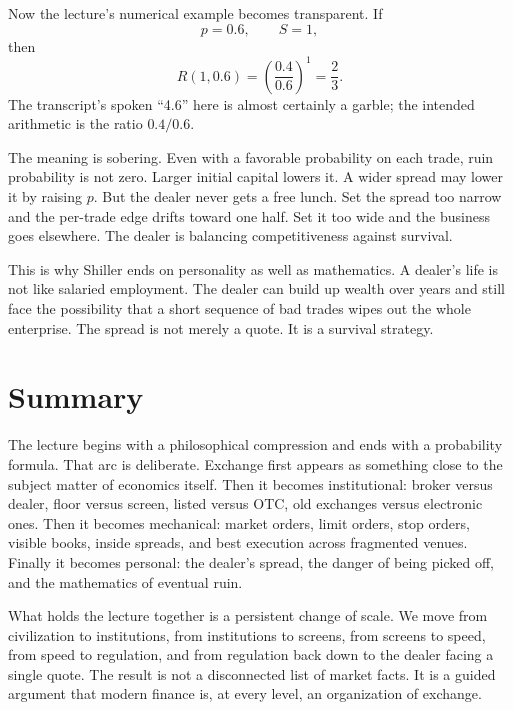 Now the lecture's numerical example becomes transparent. If
\begin{equation}
p=0.6,
\qquad
S=1,
\end{equation}
then
\begin{equation}
R(1,0.6)=\left(\frac{0.4}{0.6}\right)^1=\frac23.
\end{equation}
The transcript's spoken ``4.6'' here is almost certainly a garble; the intended arithmetic is the ratio \(0.4/0.6\).

The meaning is sobering. Even with a favorable probability on each trade, ruin probability is not zero. Larger initial capital lowers it. A wider spread may lower it by raising \(p\). But the dealer never gets a free lunch. Set the spread too narrow and the per-trade edge drifts toward one half. Set it too wide and the business goes elsewhere. The dealer is balancing competitiveness against survival.

This is why Shiller ends on personality as well as mathematics. A dealer's life is not like salaried employment. The dealer can build up wealth over years and still face the possibility that a short sequence of bad trades wipes out the whole enterprise. The spread is not merely a quote. It is a survival strategy.

\section{Summary}

The lecture begins with a philosophical compression and ends with a probability formula. That arc is deliberate. Exchange first appears as something close to the subject matter of economics itself. Then it becomes institutional: broker versus dealer, floor versus screen, listed versus OTC, old exchanges versus electronic ones. Then it becomes mechanical: market orders, limit orders, stop orders, visible books, inside spreads, and best execution across fragmented venues. Finally it becomes personal: the dealer's spread, the danger of being picked off, and the mathematics of eventual ruin.

What holds the lecture together is a persistent change of scale. We move from civilization to institutions, from institutions to screens, from screens to speed, from speed to regulation, and from regulation back down to the dealer facing a single quote. The result is not a disconnected list of market facts. It is a guided argument that modern finance is, at every level, an organization of exchange.